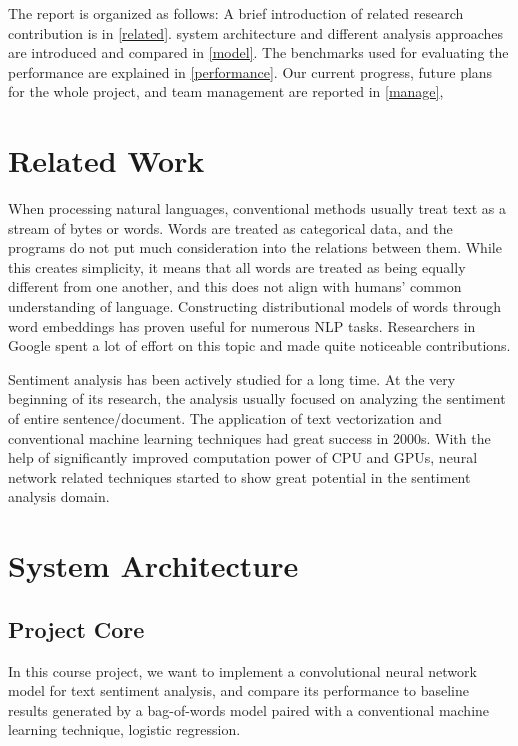 \documentclass[conference]{IEEEtran}
\begin{document}
    The report is organized as follows: 
    A brief introduction of related research contribution is in \autoref{related}.
    system architecture and different analysis approaches are introduced and compared 
    in \autoref{model}.
    The benchmarks used for evaluating the performance are explained in 
    \autoref{performance}.
    Our current progress, future plans for the whole project, and team management
    are reported in \autoref{manage},
    
\section{Related Work}
\label{related}
    When processing natural languages, conventional methods usually treat text as 
    a stream of bytes or words. Words are treated as categorical data, and the 
    programs do not put much consideration into the relations
    between them. While this creates simplicity, it means that all words are treated
    as being equally different from one another, and this does not align with humans'
    common understanding of language. Constructing distributional models of words
    through word embeddings has proven useful for numerous NLP
    tasks. Researchers in Google spent a lot of effort on this topic and 
    made quite noticeable contributions\cite{mikolov2013efficient, word2vec}.
    
    Sentiment analysis has been actively studied for a long time. At the very beginning
    of its research, the analysis usually focused on analyzing the sentiment of entire
    sentence/document\cite{sack1994computation}. The application of
    text vectorization and conventional machine learning techniques had great
    success in 2000s\cite{pang2002thumbs}. With the help of significantly improved
    computation power of CPU and GPUs, neural network related techniques 
    started to show great potential in the sentiment analysis 
    domain\cite{kim2014convolutional,barnes2017assessing}.
    
\section{System Architecture}
\label{model}
\subsection{Project Core}
\label{model:core}
    In this course project, we want to implement a convolutional neural network
    model for text sentiment analysis, and compare its performance to baseline results
    generated by a bag-of-words model paired with a conventional machine learning
    technique, logistic regression.
    
\end{document}
